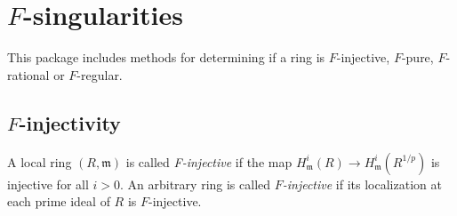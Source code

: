 \documentclass[11pt]{amsart}
\begin{document}





\section{$F$-singularities}\label{Section: F-singularities}

This package includes methods for determining if a ring is $F$-injective, $F$-pure, $F$-rational or $F$-regular.

\subsection{$F$-injectivity}

\begin{definition}
A local ring $(R, \mathfrak{m})$ is called \emph{F-injective} if the map
$H^{i}_{\mathfrak{m}}(R) \rightarrow H^{i}_{\mathfrak{m}}(R^{1/p})$ is
injective for all $i >0$. An arbitrary ring is called \emph{$F$-injective} if its
localization at each prime ideal of $R$ is $F$-injective.
\end{definition}
\end{document}
